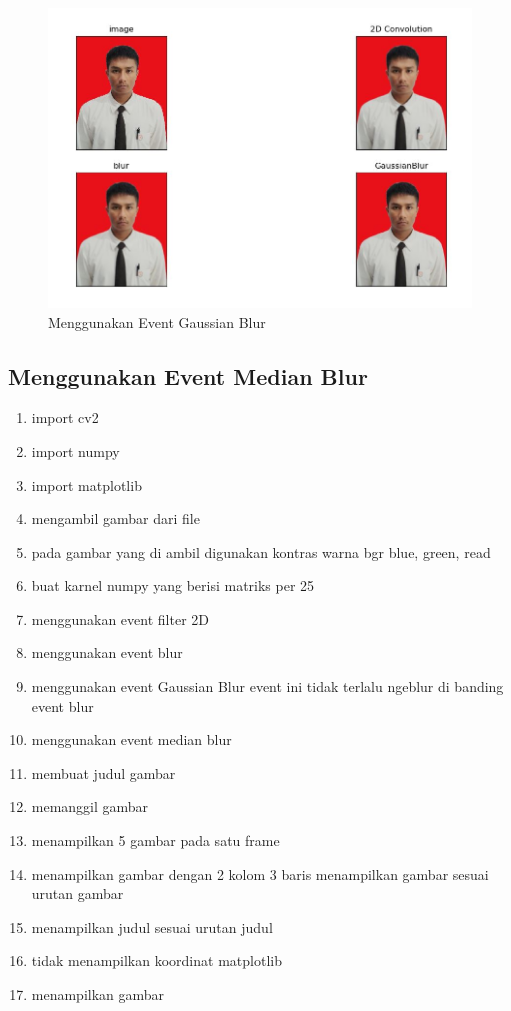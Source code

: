 \begin{figure}[ht]
\centering
\includegraphics[scale=0.5]{figures/2,61.jpg}
\caption{Menggunakan Event Gaussian Blur}
\label{contoh}
\end{figure}







\newpage
\subsection{Menggunakan Event Median Blur}

\begin{enumerate}
	\item import cv2
	\item import numpy
	\item import matplotlib
	\item mengambil gambar dari file
	\item pada gambar yang di ambil digunakan kontras warna bgr blue, green, read
	\item buat karnel numpy yang berisi matriks per 25
	\item menggunakan event filter 2D
	\item menggunakan event blur
	\item menggunakan event Gaussian Blur event ini tidak terlalu ngeblur di banding event blur
	\item menggunakan event median blur
	\item membuat judul gambar
	\item memanggil gambar
	\item menampilkan 5 gambar pada satu frame
	\item menampilkan gambar dengan 2 kolom 3 baris menampilkan gambar sesuai urutan gambar
	\item menampilkan judul sesuai urutan judul
	\item tidak menampilkan koordinat matplotlib
	\item menampilkan gambar
\end{enumerate}

